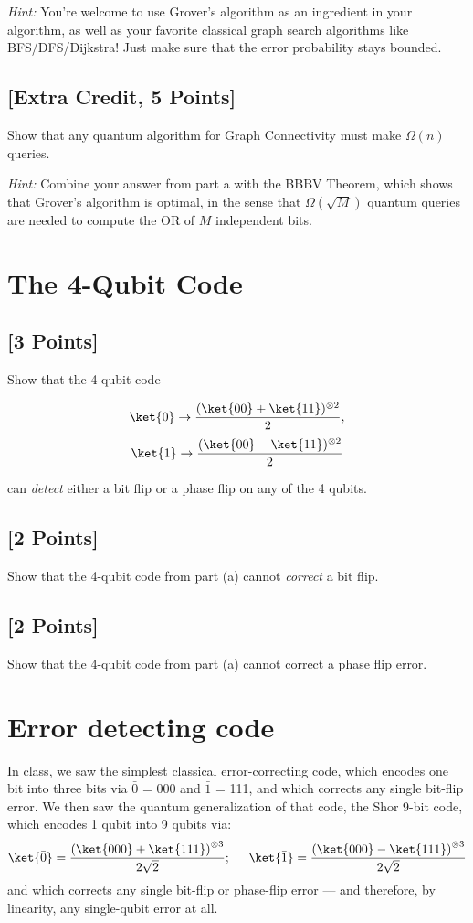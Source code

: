 \documentclass[11pt]{article}
\newcommand{\pare}[1]{\left(#1 \right)}
\newcommand{\sepsemi}{; \hspace{0.5cm}}
\begin{document}
\noindent \emph{Hint:} You're welcome to use Grover's algorithm as an ingredient in your algorithm, as well as your favorite classical graph search algorithms like BFS/DFS/Dijkstra!  Just make sure that the error probability stays bounded.


\subsection{[Extra Credit, 5 Points]} Show that any quantum algorithm for Graph Connectivity must make $\Omega(n)$ queries. 

\textit{Hint:} Combine your answer from part a with the BBBV Theorem, which shows that Grover's algorithm is optimal, in the sense that $\Omega(\sqrt{M})$ quantum queries are needed to compute the OR of $M$ independent bits.

\section{The 4-Qubit Code}

\subsection{[3 Points]} Show that the 4-qubit code 

\[\ket{0} \rightarrow \frac{(\ket{00}+\ket{11})^{\otimes 2}}{2},\]
\[\ket{1} \rightarrow \frac{(\ket{00}-\ket{11})^{\otimes 2}}{2}\]

\noindent can \emph{detect} either a bit flip or a phase flip on any of the 4 qubits.


\subsection{[2 Points]} Show that the 4-qubit code from part (a) cannot \emph{correct} a bit flip.

\subsection{[2 Points]} Show that the 4-qubit code from part (a) cannot correct a phase flip error.

\section{Error detecting code}
In class, we saw the simplest classical error-correcting code,
which encodes one bit into three bits via $\bar 0$ = 000 and $\bar 1$ = 111, and
which corrects any single bit-flip error.  We then saw the quantum
generalization of that code, the Shor 9-bit code, which encodes 1
qubit into 9 qubits via:
$$\ket{\bar 0} = \frac{\pare{\ket{000}+ \ket{111}}^{\otimes 3} }{ 2\sqrt{2}}\sepsemi \ket{\bar 1} = \frac{\pare{\ket{000}- \ket{111}}^{\otimes 3} }{ 2\sqrt{2}}$$
and which corrects any single bit-flip or phase-flip error --- and
therefore, by linearity, any single-qubit error at all.
\end{document}
